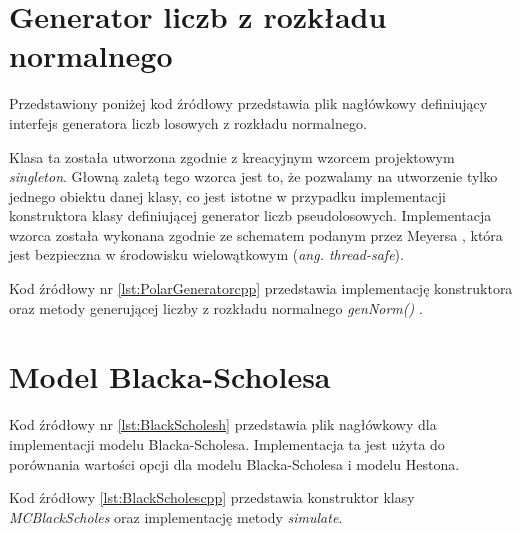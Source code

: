 \documentclass{pracamgr}
\begin{document}
\section{Generator liczb z rozkładu normalnego}
Przedstawiony poniżej kod źródłowy przedstawia plik nagłówkowy definiujący interfejs 
generatora liczb losowych z rozkładu normalnego. 
Klasa ta została utworzona zgodnie z kreacyjnym wzorcem projektowym \textit{singleton}. 
Głowną zaletą tego wzorca jest to, że pozwalamy na utworzenie tylko jednego obiektu danej 
klasy, co jest istotne w przypadku implementacji konstruktora klasy definiującej
generator liczb pseudolosowych.
Implementacja wzorca została wykonana zgodnie ze schematem podanym przez Meyersa \cite{Meyers}, 
która jest bezpieczna w środowisku wielowątkowym (\textit{ang. thread-safe}).
Kod źródłowy nr \ref{lst:PolarGeneratorcpp} przedstawia implementację konstruktora oraz metody
generującej liczby z rozkładu normalnego \textit{genNorm()} \cite{joshi2008c++}.


\clearpage
\section{Model Blacka-Scholesa}
Kod źródłowy nr \ref{lst:BlackScholesh} przedstawia plik nagłówkowy dla implementacji 
modelu Blacka-Scholesa. Implementacja ta jest użyta do porównania wartości opcji dla 
modelu Blacka-Scholesa i modelu Hestona.
Kod źródłowy \ref{lst:BlackScholescpp} przedstawia konstruktor klasy \textit{MCBlackScholes} 
oraz implementację metody \textit{simulate}.
\end{document}

